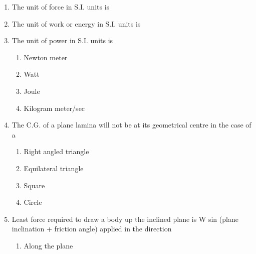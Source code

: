 \documentclass[11pt,a4paper]{article}
\begin{document}
\begin{enumerate}
\\
\item{The unit of force in S.I. units is}
\\
\item{The unit of work or energy in S.I. units is}
\\
\item{The unit of power in S.I. units is}
\begin{enumerate}[label=\Alph*.]
\item{Newton meter}
\item{Watt}
\item{Joule}
\item{Kilogram meter/sec}
\end{enumerate}
\item{The C.G. of a plane lamina will not be at its geometrical centre in the case of a}
\begin{enumerate}[label=\Alph*.]
\item{Right angled triangle}
\item{Equilateral triangle}
\item{Square}
\item{Circle}
\end{enumerate}
\item{Least force required to draw a body up the inclined plane is W sin (plane inclination + friction angle) applied in the direction}
\begin{enumerate}[label=\Alph*.]
\item{Along the plane}

\end{enumerate}
\end{enumerate}
\end{document}
